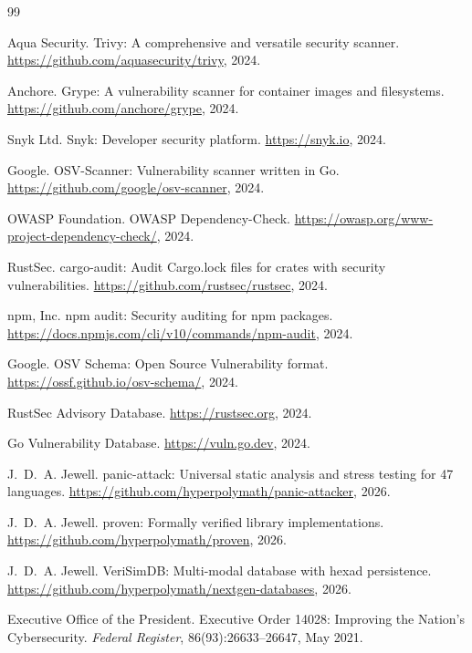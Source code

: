 \documentclass[11pt,twocolumn]{article}
\begin{document}
\begin{thebibliography}{99}

Aqua Security.
\newblock Trivy: A comprehensive and versatile security scanner.
\newblock \url{https://github.com/aquasecurity/trivy}, 2024.

Anchore.
\newblock Grype: A vulnerability scanner for container images and filesystems.
\newblock \url{https://github.com/anchore/grype}, 2024.

Snyk Ltd.
\newblock Snyk: Developer security platform.
\newblock \url{https://snyk.io}, 2024.

Google.
\newblock OSV-Scanner: Vulnerability scanner written in Go.
\newblock \url{https://github.com/google/osv-scanner}, 2024.

OWASP Foundation.
\newblock OWASP Dependency-Check.
\newblock \url{https://owasp.org/www-project-dependency-check/}, 2024.

RustSec.
\newblock cargo-audit: Audit Cargo.lock files for crates with security vulnerabilities.
\newblock \url{https://github.com/rustsec/rustsec}, 2024.

npm, Inc.
\newblock npm audit: Security auditing for npm packages.
\newblock \url{https://docs.npmjs.com/cli/v10/commands/npm-audit}, 2024.

Google.
\newblock OSV Schema: Open Source Vulnerability format.
\newblock \url{https://ossf.github.io/osv-schema/}, 2024.

RustSec Advisory Database.
\newblock \url{https://rustsec.org}, 2024.

Go Vulnerability Database.
\newblock \url{https://vuln.go.dev}, 2024.

J.~D.~A. Jewell.
\newblock panic-attack: Universal static analysis and stress testing for 47 languages.
\newblock \url{https://github.com/hyperpolymath/panic-attacker}, 2026.

J.~D.~A. Jewell.
\newblock proven: Formally verified library implementations.
\newblock \url{https://github.com/hyperpolymath/proven}, 2026.

J.~D.~A. Jewell.
\newblock VeriSimDB: Multi-modal database with hexad persistence.
\newblock \url{https://github.com/hyperpolymath/nextgen-databases}, 2026.

Executive Office of the President.
\newblock Executive Order 14028: Improving the Nation's Cybersecurity.
\newblock \emph{Federal Register}, 86(93):26633--26647, May 2021.


\end{thebibliography}
\end{document}
